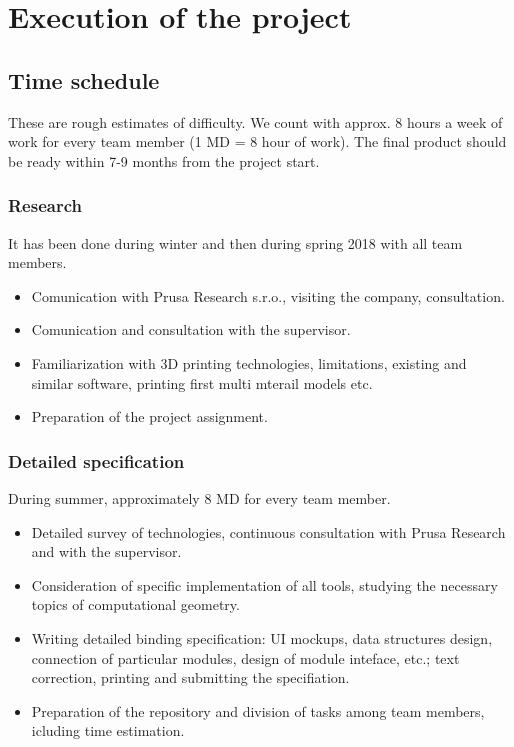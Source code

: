 \chapter{Execution of the project}

\section{Time schedule}

These are rough estimates of difficulty. We count with approx. 8 hours a week of work for every team member (1 MD = 8 hour of work). The final product should be ready within 7-9 months from the project start.


\subsection{Research}

It has been done during winter and then during spring 2018 with all team members.

\begin{itemize}
\item Comunication with Prusa Research s.r.o., visiting the company, consultation.
\item Comunication and consultation with the supervisor.
\item Familiarization with 3D printing technologies, limitations, existing and similar software, printing first multi mterail models etc. 
\item Preparation of the project assignment.
\end{itemize}


\subsection{Detailed specification}

During summer, approximately 8 MD for every team member.

\begin{itemize}
\item Detailed survey of technologies, continuous consultation with Prusa Research and with the supervisor.
\item Consideration of specific implementation of all tools, studying the necessary topics of computational geometry.
\item Writing detailed binding specification: UI mockups, data structures design, connection of particular modules, design of module inteface, etc.; text correction, printing and submitting the specifiation.
\item Preparation of the repository and division of tasks among team members, icluding time estimation.
\end{itemize}


